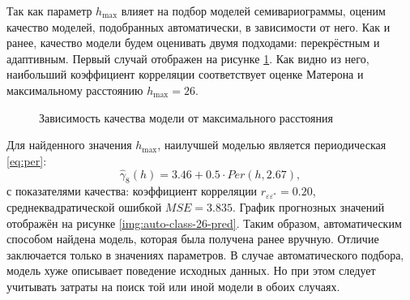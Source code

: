 Так как параметр $ h_{\text{max}} $ влияет на подбор моделей семивариограммы, оценим качество моделей, подобранных автоматически, в зависимости от него. Как и ранее, качество модели будем оценивать двумя подходами: перекрёстным и адаптивным. Первый случай отображен на рисунке \ref{img:auto-corr-cutoff}. Как видно из него, наибольший коэффициент корреляции соответствует оценке Матерона и максимальному расстоянию $ h_{\text{max}} = 26 $.
\begin{figure}[ht]
\caption{Зависимость качества модели от максимального расстояния}
\label{img:auto-corr-cutoff}
\end{figure}
Для найденного значения $ h_{\text{max}} $, наилучшей моделью является периодическая \eqref{eq:per}:
\begin{equation*}
 	\widehat{\gamma}_8(h) = 3.46 + 0.5 \cdot Per(h, 2.67),
\end{equation*}
с показателями качества: коэффициент корреляции $ r_{\varepsilon\varepsilon^{*}} = 0.20 $, среднеквадратической ошибкой $ MSE = 3.835 $. График прогнозных значений отображён на рисунке \ref{img:auto-class-26-pred}. Таким образом, автоматическим способом найдена модель, которая была получена ранее вручную. Отличие заключается только в значениях параметров. В случае автоматического подбора, модель хуже описывает поведение исходных данных. Но при этом следует учитывать затраты на поиск той или иной модели в обоих случаях.

